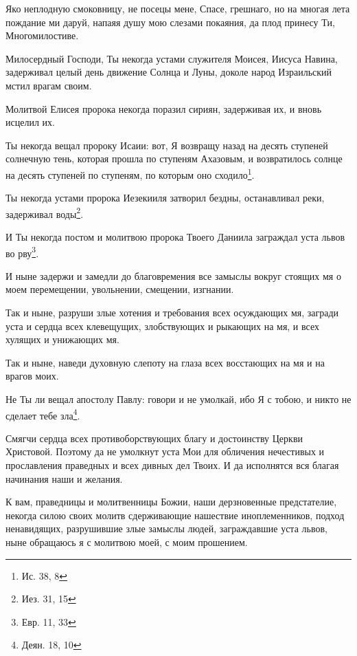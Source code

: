 \tolkopoblagosloveniyu

\begin{mymulticols}



Яко неплодную смоковницу, не посецы мене, Спасе, грешнаго, но на многая лета пождание ми даруй, напаяя душу мою слезами покаяния, да плод принесу Ти, Многомилостиве.



Милосердный Господи, Ты некогда устами служителя Моисея, Иисуса Навина, задерживал целый день движение Солнца и Луны, доколе народ Израильский мстил врагам своим.

Молитвой Елисея пророка некогда поразил сириян, задерживая их, и вновь исцелил их.

Ты некогда вещал пророку Исаии: вот, Я возвращу назад на десять ступеней солнечную тень, которая прошла по ступеням Ахазовым, и возвратилось солнце на десять ступеней по ступеням, по которым оно сходило\footnote{Ис. 38, 8}.

Ты некогда устами пророка Иезекииля затворил бездны, останавливал реки, задерживал воды\footnote{Иез. 31, 15}.

И Ты некогда постом и молитвою пророка Твоего Даниила заграждал уста львов во рву\footnote{Евр. 11, 33}.

И ныне задержи и замедли до благовремения все замыслы вокруг стоящих мя о моем перемещении, увольнении, смещении, изгнании.

Так и ныне, разруши злые хотения и требования всех осуждающих мя, загради уста и сердца всех клевещущих, злобствующих и рыкающих на мя, и всех хулящих и унижающих мя.

Так и ныне, наведи духовную слепоту на глаза всех восстающих на мя и на врагов моих.

Не Ты ли вещал апостолу Павлу: говори и не умолкай, ибо Я с тобою, и никто не сделает тебе зла\footnote{Деян. 18, 10}.

Смягчи сердца всех противоборствующих благу и достоинству Церкви Христовой. Поэтому да не умолкнут уста Мои для обличения нечестивых и прославления праведных и всех дивных дел Твоих. И да исполнятся вся благая начинания наши и желания.


К вам, праведницы и молитвенницы Божии, наши дерзновенные предстателие, некогда силою своих молитв сдерживающие нашествие иноплеменников, подход ненавидящих, разрушившие злые замыслы людей, заграждавшие уста львов, ныне обращаюсь я с молитвою моей, с моим прошением.



\end{mymulticols}
